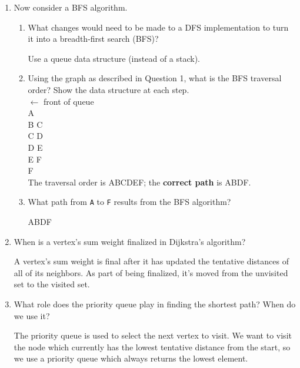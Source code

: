 \documentclass[11pt]{article}
\newenvironment{answer}{\large\lstset{basicstyle=\tiny\ttfamily}\color{white} }{}
\newenvironment{answer}{\large\lstset{basicstyle=\large\ttfamily}\color{red} }{}
\begin{document}
\begin{enumerate}
\begin{enumerate}
\end{enumerate}


\item Now consider a BFS algorithm.
\begin{enumerate}
\item
What changes would need to be made to a DFS implementation to turn it into a breadth-first search (BFS)?

\begin{answer}
Use a queue data structure (instead of a stack).
\end{answer}

\item
Using the graph as described in Question 1, what is the BFS traversal order?
Show the data structure at each step. \\
\begin{answer}
$\leftarrow$ front of queue \\
A \\
B C \\
C D \\
D E \\
E F \\
F \\

The traversal order is ABCDEF; the \textbf{correct path} is ABDF.
\end{answer}

\item
What path from \texttt{A} to \texttt{F} results from the BFS algorithm?

\begin{answer}
ABDF
\end{answer}

\end{enumerate}


\item When is a vertex's sum weight finalized in Dijkstra's algorithm?

    \begin{answer}
    A vertex's sum weight is final after it has updated the tentative distances
    of all of its neighbors. As part of being finalized, it's moved from the
    unvisited set to the visited set.
    \end{answer}


\item What role does the priority queue play in finding the shortest path?
      When do we use it?

    \begin{answer}
    The priority queue is used to select the next vertex to visit. We want to
    visit the node which currently has the lowest tentative distance from the
    start, so we use a priority queue which always returns the lowest element.
    \end{answer}



\end{enumerate}
\end{document}
